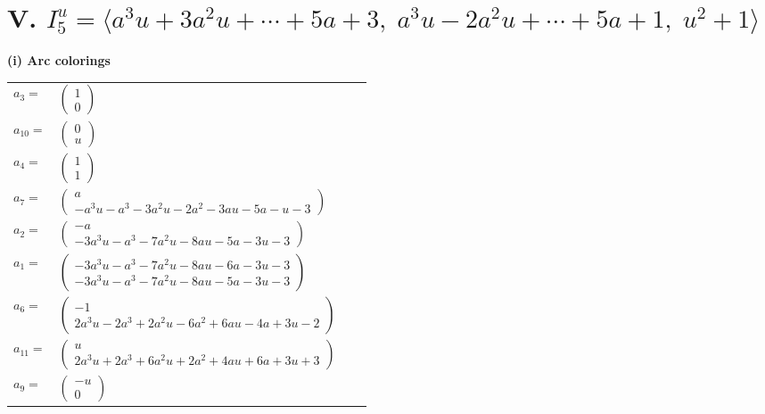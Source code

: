 \documentclass[1p]{elsarticle_modified}
\theoremstyle{definition}
\begin{document}
\centering \section*{V. $I^u_{5}= \langle a^3 u+3 a^2 u+\cdots+5 a+3,\;a^3 u-2 a^2 u+\cdots+5 a+1,\;u^2+1 \rangle$}
\flushleft \textbf{(i) Arc colorings}\\
\begin{tabular}{m{7pt} m{180pt} m{7pt} m{180pt} }
\flushright $a_{3}=$&$\begin{pmatrix}1\\0\end{pmatrix}$ \\
\flushright $a_{10}=$&$\begin{pmatrix}0\\u\end{pmatrix}$ \\
\flushright $a_{4}=$&$\begin{pmatrix}1\\1\end{pmatrix}$ \\
\flushright $a_{7}=$&$\begin{pmatrix}a\\- a^3 u- a^3-3 a^2 u-2 a^2-3 a u-5 a- u-3\end{pmatrix}$ \\
\flushright $a_{2}=$&$\begin{pmatrix}- a\\-3 a^3 u- a^3-7 a^2 u-8 a u-5 a-3 u-3\end{pmatrix}$ \\
\flushright $a_{1}=$&$\begin{pmatrix}-3 a^3 u- a^3-7 a^2 u-8 a u-6 a-3 u-3\\-3 a^3 u- a^3-7 a^2 u-8 a u-5 a-3 u-3\end{pmatrix}$ \\
\flushright $a_{6}=$&$\begin{pmatrix}-1\\2 a^3 u-2 a^3+2 a^2 u-6 a^2+6 a u-4 a+3 u-2\end{pmatrix}$ \\
\flushright $a_{11}=$&$\begin{pmatrix}u\\2 a^3 u+2 a^3+6 a^2 u+2 a^2+4 a u+6 a+3 u+3\end{pmatrix}$ \\
\flushright $a_{9}=$&$\begin{pmatrix}- u\\0\end{pmatrix}$ \\

\end{tabular}
\end{document}
